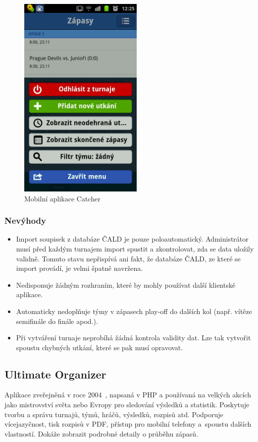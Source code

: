 \begin{figure}[ht!]
\centering
\includegraphics[width=60mm]{./images/catcher.png}
\caption{Mobilní aplikace Catcher~\cite{catcher_play}\label{overflow}}
\label{fig:uwsgi}
\end{figure}

\subsubsection*{Nevýhody}
\begin{itemize}
  \item Import soupisek z databáze ČALD je pouze poloautomatický. Administrátor musí před každým turnajem
    import spustit a zkontrolovat, zda se data uložily validně. Tomuto stavu nepřispívá ani fakt,
    že databáze ČALD, ze které se import provádí, je velmi špatně navržena.
  \item Nedisponuje žádným rozhraním, které by mohly používat další klientské aplikace.
  \item Automaticky nedoplňuje týmy v zápasech play-off do dalších kol (např. vítěze semifinále do finále apod.).
  \item Při vytváření turnaje neprobíhá žádná kontrola validity dat.
    Lze tak vytvořit spoustu chybných utkání, které se pak musí opravovat. 
\end{itemize}

\subsection*{Ultimate Organizer}

Aplikace zveřejněná v roce 2004~\cite{ultimate_organizer}, napsaná v PHP a používaná na velkých akcích jako mistrovství světa nebo Evropy
pro sledování výsledků a statistik. Poskytuje tvorbu a správu turnajů, týmů, hráčů,
výsledků, rozpisů atd. Podporuje vícejazyčnost, tisk rozpisů v PDF, přístup pro mobilní telefony
a~spoustu dalších vlastností. Dokáže zobrazit podrobné detaily o průběhu zápasů.

